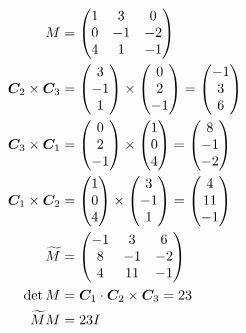 \documentclass{article}
\begin{document}
	\begin{align*}
		M &= \begin{pmatrix}
			1 & 3 & 0 \\ 0 & -1 & -2 \\ 4 & 1 & -1
		\end{pmatrix} \\
		\bm C_2 \times \bm C_3 &= \begin{pmatrix} 3 \\ -1 \\ 1 \end{pmatrix} \times \begin{pmatrix} 0 \\ 2 \\ -1 \end{pmatrix} = \begin{pmatrix} -1 \\ 3 \\ 6 \end{pmatrix} \\
		\bm C_3 \times \bm C_1 &= \begin{pmatrix} 0 \\ 2 \\ -1 \end{pmatrix} \times \begin{pmatrix} 1 \\ 0 \\ 4 \end{pmatrix} = \begin{pmatrix} 8 \\ -1 \\ -2 \end{pmatrix} \\
		\bm C_1 \times \bm C_2 &= \begin{pmatrix} 1 \\ 0 \\ 4 \end{pmatrix} \times \begin{pmatrix} 3 \\ -1 \\ 1 \end{pmatrix} = \begin{pmatrix} 4 \\ 11 \\ -1 \end{pmatrix} \\
		\widetilde{M} &= \begin{pmatrix}
			-1 & 3 & 6 \\ 8 & -1 & -2 \\ 4 & 11 & -1
		\end{pmatrix} \\
		\det M &= \bm C_1 \cdot \bm C_2 \times \bm C_3 = 23 \\
		\widetilde{M} M &= 23 I
	\end{align*}
\end{document}
